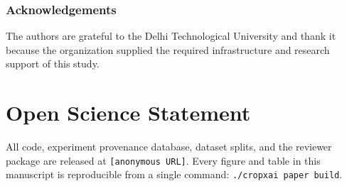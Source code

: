 \documentclass[10pt,journal]{IEEEtran}
\begin{document}
\subsubsection*{Acknowledgements}
The authors are grateful to the Delhi Technological University and thank it because the organization supplied the required infrastructure and research support of this study.

\section*{Open Science Statement}
All code, experiment provenance database, dataset splits, and the reviewer
package are released at \texttt{[anonymous URL]}. Every figure and table
in this manuscript is reproducible from a single command:
\texttt{./cropxai paper build}.



\end{document}
